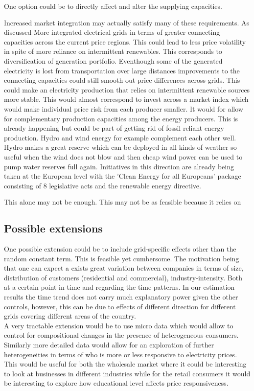 One option could be to directly affect and alter the supplying capacities.

Increased market integration may actually satisfy many of these requirements. As discussed  More integrated electrical grids in terms of greater connecting capacities across the current price regions. This could lead to less price volatility in spite of more reliance on intermittent renewables. This corresponds to diversification of generation portfolio.  Eventhough some of the generated electricity is lost from transportation over large distances improvements to the connecting capacities could still smooth out price differences across grids. This could make an electricity production that relies on intermittent renewable sources more stable. This would almost correspond to invest across a market index which would make individual price risk from each producer smaller. It would for allow for complementary production capacities among the energy producers. This is already happening but could be part of getting rid of fossil reliant energy production. Hydro and wind energy for example complement each other well. Hydro makes a great reserve which can be deployed in all kinds of weather so useful when the wind does not blow and then cheap wind power can be used to pump water reserves full again. Initiatives in this direction are already being taken at the European level with the 'Clean Energy for all Europeans' package consisting of 8 legislative acts and the renewable energy directive.

This alone may not be enough. This may not be as feasible because it relies on



\subsection{Possible extensions}
\label{subsec:r_extensions}
One possible extension could be to include grid-specific effects other than the random constant term. This is feasible yet cumbersome. The motivation being that one can expect a exists great variation between companies in terms of size, distribution of customers (residential and commercial), industry-intensity. Both at a certain point in time and regarding the time patterns. In our estimation results the time trend does not carry much explanatory power given the other controls, however, this can be due to effects of different direction for different grids covering different areas of the country.
\medskip\\
A very tractable extension would be to use micro data which would allow to control for compositional changes in the presence of heterogeneous consumers. Similarly more detailed data would allow for an exploration of further heterogeneities in terms of who is more or less responsive to electricity prices. This would be useful for both the wholesale market where it could be interesting to look at businesses in different industries while for the retail consumers it would be interesting to explore how educational level affects price responsiveness.
